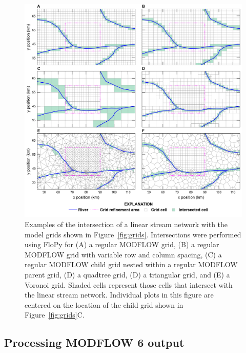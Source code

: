 \documentclass[12pt, oneside]{article}  	%
\begin{document}
\begin{figure}[ht!]
	\begin{center}
		\includegraphics{figures/grids_intersection.png}
	\end{center}
	\caption{Examples of the intersection of a linear stream network with the model grids shown in Figure~\ref{fig:grids}. Intersections were performed using FloPy for (A) a regular MODFLOW grid, (B) a regular MODFLOW grid with variable row and column spacing, (C) a regular MODFLOW child grid nested within a regular MODFLOW parent grid, (D) a quadtree grid, (D) a triangular grid, and (E) a Voronoi grid. Shaded cells represent those cells that intersect with the linear stream network. Individual plots in this figure are centered on the location of the child grid shown in Figure~\ref{fig:grids}C.}
	\label{fig:intersections}
\end{figure}


\subsection*{Processing MODFLOW 6 output}
\end{document}

